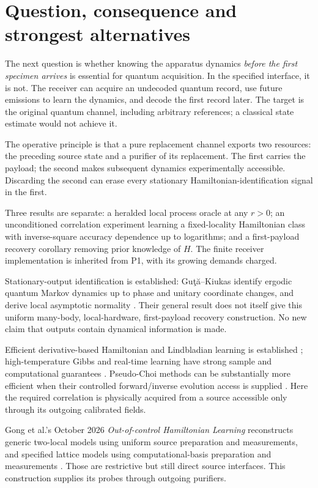 \documentclass[11pt]{article}
\begin{document}
\section{Question, consequence and strongest alternatives}
The next question is whether knowing the apparatus dynamics \emph{before the first specimen arrives} is essential for quantum acquisition. In the specified interface, it is not. The receiver can acquire an undecoded quantum record, use future emissions to learn the dynamics, and decode the first record later. The target is the original quantum channel, including arbitrary references; a classical state estimate would not achieve it.

The operative principle is that a pure replacement channel exports two resources: the preceding source state and a purifier of its replacement. The first carries the payload; the second makes subsequent dynamics experimentally accessible. Discarding the second can erase every stationary Hamiltonian-identification signal in the first.

Three results are separate: a heralded local process oracle at any \(r>0\); an unconditioned correlation experiment learning a fixed-locality Hamiltonian class with inverse-square accuracy dependence up to logarithms; and a first-payload recovery corollary removing prior knowledge of \(H\). The finite receiver implementation is inherited from P1, with its growing demands charged.

Stationary-output identification is established: Gu\c{t}\u{a}--Kiukas identify ergodic quantum Markov dynamics up to phase and unitary coordinate changes, and derive local asymptotic normality \cite{guta}. Their general result does not itself give this uniform many-body, local-hardware, first-payload recovery construction. No new claim that outputs contain dynamical information is made.

Efficient derivative-based Hamiltonian and Lindbladian learning is established \cite{franca}; high-temperature Gibbs and real-time learning have strong sample and computational guarantees \cite{haah}. Pseudo-Choi methods can be substantially more efficient when their controlled forward/inverse evolution access is supplied \cite{castaneda}. Here the required correlation is physically acquired from a source accessible only through its outgoing calibrated fields.

Gong et al.'s October 2026 \emph{Out-of-control Hamiltonian Learning} reconstructs generic two-local models using uniform source preparation and measurements, and specified lattice models using computational-basis preparation and measurements \cite{gong}. Those are restrictive but still direct source interfaces. This construction supplies its probes through outgoing purifiers.
\end{document}
